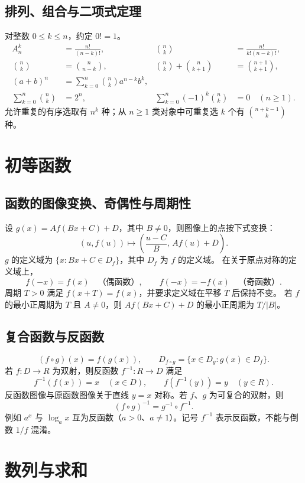 \documentclass[../main.tex]{subfiles}
\begin{document}
\subsection{排列、组合与二项式定理}
对整数 $0\le k\le n$，约定 $0!=1$。
\begin{align*}
A_n^k&=\frac{n!}{(n-k)!}, & \binom nk&=\frac{n!}{k!(n-k)!},\\
\binom nk&=\binom n{n-k}, & \binom nk+\binom n{k+1}&=\binom{n+1}{k+1},\\
(a+b)^n&=\sum_{k=0}^n\binom nk a^{n-k}b^k,\\
\sum_{k=0}^n\binom nk&=2^n, & \sum_{k=0}^n(-1)^k\binom nk&=0\quad(n\ge1).
\end{align*}
允许重复的有序选取有 $n^k$ 种；从 $n\ge1$ 类对象中可重复选 $k$ 个有 $\binom{n+k-1}{k}$ 种。
\section{初等函数}
\subsection{函数的图像变换、奇偶性与周期性}
设 $g(x)=Af(Bx+C)+D$，其中 $B\ne0$，则图像上的点按下式变换：
\[
(u,f(u))\longmapsto\left(\frac{u-C}{B},\,Af(u)+D\right).
\]
$g$ 的定义域为 $\{x:Bx+C\in D_f\}$，其中 $D_f$ 为 $f$ 的定义域。
在关于原点对称的定义域上，
\[
f(-x)=f(x)\quad\text{（偶函数）},\qquad
f(-x)=-f(x)\quad\text{（奇函数）}.
\]
周期 $T>0$ 满足 $f(x+T)=f(x)$，并要求定义域在平移 $T$ 后保持不变。
若 $f$ 的最小正周期为 $T$ 且 $A\ne0$，则 $Af(Bx+C)+D$ 的最小正周期为 $T/|B|$。
\subsection{复合函数与反函数}
\[
(f\circ g)(x)=f(g(x)),\qquad
D_{f\circ g}=\{x\in D_g:g(x)\in D_f\}.
\]
若 $f:D\to R$ 为双射，则反函数 $f^{-1}:R\to D$ 满足
\[
f^{-1}(f(x))=x\quad(x\in D),\qquad
f(f^{-1}(y))=y\quad(y\in R).
\]
反函数图像与原函数图像关于直线 $y=x$ 对称。若 $f$、$g$ 为可复合的双射，则
\[
(f\circ g)^{-1}=g^{-1}\circ f^{-1}.
\]
例如 $a^x$ 与 $\log_ax$ 互为反函数（$a>0$、$a\ne1$）。记号 $f^{-1}$ 表示反函数，不能与倒数 $1/f$ 混淆。
\section{数列与求和}
\end{document}
